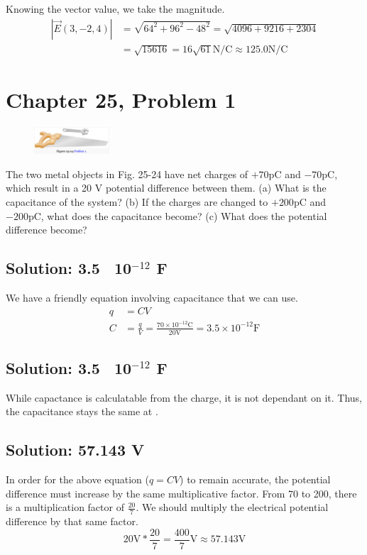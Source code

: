 \documentclass[12pt]{article}
\begin{document}
Knowing the vector value, we take the magnitude.
\begin{align*}
    \left|\vec{E}(3, -2, 4)\right|  &=  \sqrt{64^2 + 96^2 - 48^2}
        =   \sqrt{4096 + 9216 + 2304}\\
        &=  \sqrt{15616}
        =   \boxed{16 \sqrt{61} \unit{\newton/\coulomb} \approx 125.0 \unit{\newton/\coulomb}}
\end{align*}

\pagebreak
\section{Chapter 25, Problem 1}
\begin{figure}
    \vspace{-30pt}
    \includegraphics[width=0.25\textwidth]{picture_8.png} 
\end{figure}
The two metal objects in Fig. 25-24 have net charges of $+70 \unit{\pico\coulomb}$ and $-70 \unit{\pico\coulomb}$, which result in a 20 V potential difference between them. (a) What is the capacitance of the system? (b) If the
charges are changed to $+200 \unit{\pico\coulomb}$ and $-200 \unit{\pico\coulomb}$, what does the capacitance become? (c) What does the potential difference become?

\subsection{Solution: 3.5 \texttimes\ 10$^{-12}$ F}
We have a friendly equation involving capacitance that we can use.
\begin{align*}
    q   &=  CV\\
    C   &=  \frac{q}{V}
        =   \frac{70 \times 10^{-12} \unit{\coulomb}}{20 \unit{\volt}}
        =   \boxed{3.5 \times 10^{-12} \unit{\farad}}
\end{align*}

\subsection{Solution: 3.5 \texttimes\ 10$^{-12}$ F}
While capactance is calculatable from the charge, it is not dependant on it. 
Thus, the capacitance stays the same at .

\subsection{Solution: 57.143 V}
In order for the above equation ($q = CV$) to remain accurate, the potential difference must increase by the same multiplicative factor.
From 70 to 200, there is a multiplication factor of $\frac{20}{7}$. 
We should multiply the electrical potential difference by that same factor.
\begin{equation*}
    20 \unit{\volt} * \frac{20}{7} = \boxed{\frac{400}{7} \unit{\volt} \approx 57.143 \unit{\volt}}
\end{equation*}
\end{document}
